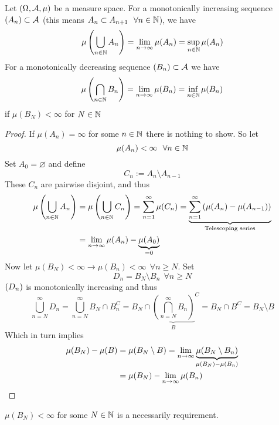 \documentclass[../../script.tex]{subfiles}
\begin{document}
\begin{thm}
    Let $\measure$ be a measure space. For a monotonically increasing sequence $\anyseqdef[A]{\setfam}$ (this means $A_n \subset A_{n+1} ~~\forall n \in \natn$), we have
    \[
        \mu\left(\bigcup_{n \in \natn} A_n\right) = \limn \mu(A_n) = \sup_{n \in \natn} \mu(A_n) 
    \]
    For a monotonically decreasing sequence $\anyseqdef[B]{\setfam}$ we have 
    \[
        \mu\left(\bigcap_{n \in \natn} B_n\right) = \limn \mu(B_n) = \inf_{n \in \natn} \mu(B_n)
    \]
    if $\mu(B_N) < \infty$ for $N \in \natn$
\end{thm}
\begin{proof}
    If $\mu(A_n) = \infty$ for some $n \in \natn$ there is nothing to show. So let 
    \begin{equation}
        \mu(A_n) < \infty ~~\forall n \in \natn
    \end{equation}
    Set $A_0 = \varnothing$ and define 
    \begin{equation}
        C_n := A_n \setminus A_{n-1}
    \end{equation}
    These $C_n$ are pairwise disjoint, and thus 
    \begin{equation}
        \begin{split}
            \mu\left( \bigcup_{n \in \natn} A_n \right) &= \mu\left( \bigcup_{n \in \natn} C_n \right) = \sum_{n=1}^{\infty} \mu(C_n) = \underbrace{\sum_{n=1}^{\infty}\left( \mu(A_n) - \mu(A_{n-1}) \right)}_{\text{Telescoping series}} \\
            &= \limn \mu(A_n) - \underbrace{\mu(A_0)}_{= 0}
        \end{split}
    \end{equation}
    Now let $\mu(B_N) < \infty \rightarrow \mu(B_n) < \infty ~~\forall n \ge N$. Set 
    \begin{equation}
        D_n = B_N \setminus B_n ~~\forall n \ge N
    \end{equation}
    $\seq{D}$ is monotonically increasing and thus 
    \begin{equation}
        \bigcup_{n = N}^{\infty} D_n = \bigcup_{n = N}^{\infty} B_N \cap B_n^C = B_N \cap {\underbrace{\left( \bigcap_{n = N}^{\infty} B_n \right)}_B}^C = B_N \cap B^C = B_N \setminus B
    \end{equation}
    Which in turn implies 
    \begin{equation}
        \begin{split}
            \mu(B_N) - \mu(B) &= \mu(B_N \setminus B) = \limn \underbrace{\mu(B_N \setminus B_n)}_{\mu(B_N) - \mu(B_n)} \\
            &= \mu(B_N) - \limn \mu(B_n)
        \end{split}
    \end{equation}
\end{proof}

\begin{rem}
    $\mu(B_N) < \infty$ for some $N \in \natn$ is a necessarily requirement.
\end{rem}
\end{document}
